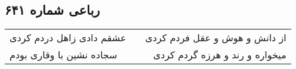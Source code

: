 \begin{center}
\section*{رباعی شماره ۶۴۱}
\label{sec:sh641}
\begin{longtable}{l p{0.5cm} r}
عشقم دادی زاهل دردم کردی
&&
از دانش و هوش و عقل فردم کردی
\\
سجاده نشین با وقاری بودم
&&
میخواره و رند و هرزه گردم کردی
\\
\end{longtable}
\end{center}

